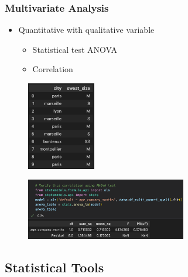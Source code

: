 \begin{frame}\frametitle{Multivariate Analysis}
   \begin{minipage}{0.42\linewidth}
      \begin{itemize}
         \item Quantitative with qualitative variable
         \begin{itemize}
            \item Statistical test ANOVA
            \item Correlation
         \end{itemize}
      \end{itemize}
      \vspace{.5cm}
      \begin{figure}[H]
         \includegraphics[width=3cm]{../images/illustrations/pattern_multivariate_qualitative_df.png}
      \end{figure}
   \end{minipage}
   \begin{minipage}{0.56\linewidth}
      \begin{figure}[H]
         \includegraphics[width=7cm]{../images/illustrations/pattern_multivariate_quanti_quali_stat_test.png}
      \end{figure}
   \end{minipage}
\end{frame}



\subsection{Statistical Tools}


